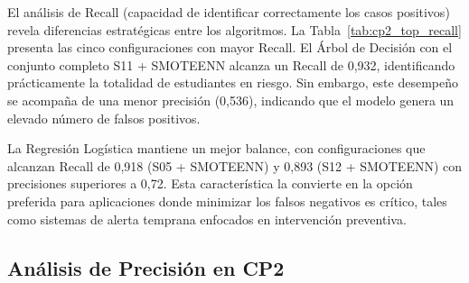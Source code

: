 \documentclass[12pt, letterpaper, openany]{report}
\begin{document}
El análisis de Recall (capacidad de identificar correctamente los casos positivos) revela diferencias estratégicas entre los algoritmos. La Tabla~\ref{tab:cp2_top_recall} presenta las cinco configuraciones con mayor Recall. El Árbol de Decisión con el conjunto completo S11 + SMOTEENN alcanza un Recall de 0,932, identificando prácticamente la totalidad de estudiantes en riesgo. Sin embargo, este desempeño se acompaña de una menor precisión (0,536), indicando que el modelo genera un elevado número de falsos positivos.

La Regresión Logística mantiene un mejor balance, con configuraciones que alcanzan Recall de 0,918 (S05 + SMOTEENN) y 0,893 (S12 + SMOTEENN) con precisiones superiores a 0,72. Esta característica la convierte en la opción preferida para aplicaciones donde minimizar los falsos negativos es crítico, tales como sistemas de alerta temprana enfocados en intervención preventiva.

\begin{table}[!htbp]
  \centering
  \caption{Cinco mejores configuraciones por Recall en CP2 (capacidad de detección de casos positivos). Los algoritmos basados en árboles (DT, RF) logran los mayores Recall, aunque con trade-off en precisión. Reg. Logística mantiene balance superior.}
  \label{tab:cp2_top_recall}
  \small
\end{table}

\FloatBarrier

\subsection{Análisis de Precisión en CP2}
\end{document}
